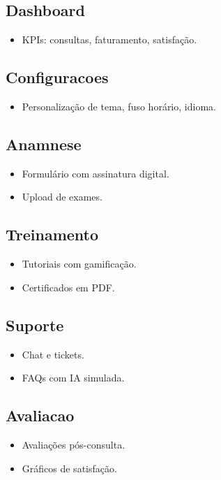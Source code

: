 \documentclass[a4paper,12pt]{article}
\begin{document}
\subsection{Dashboard}
\begin{itemize}
    \item KPIs: consultas, faturamento, satisfação.
\end{itemize}

\subsection{Configuracoes}
\begin{itemize}
    \item Personalização de tema, fuso horário, idioma.
\end{itemize}

\subsection{Anamnese}
\begin{itemize}
    \item Formulário com assinatura digital.
    \item Upload de exames.
\end{itemize}

\subsection{Treinamento}
\begin{itemize}
    \item Tutoriais com gamificação.
    \item Certificados em PDF.
\end{itemize}

\subsection{Suporte}
\begin{itemize}
    \item Chat e tickets.
    \item FAQs com IA simulada.
\end{itemize}

\subsection{Avaliacao}
\begin{itemize}
    \item Avaliações pós-consulta.
    \item Gráficos de satisfação.
\end{itemize}
\end{document}
